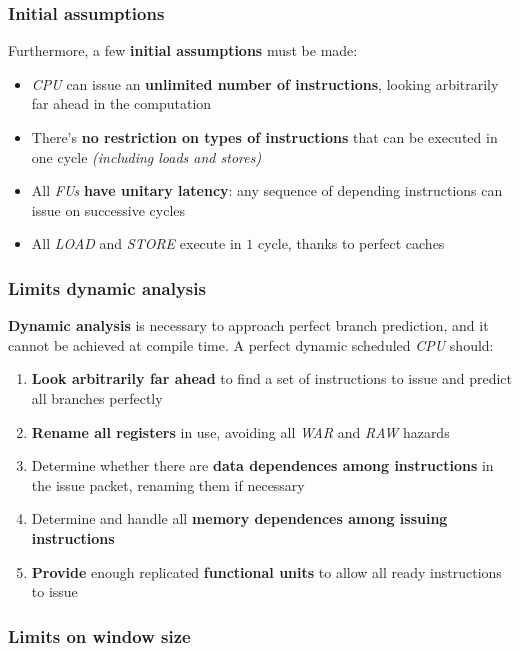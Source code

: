 \documentclass[english]{article}
\begin{document}
\subsubsection{Initial assumptions}

Furthermore, a few \textbf{initial assumptions} must be made:

\begin{itemize}
  \item \textit{CPU} can issue an\textbf{ unlimited number of instructions}, looking arbitrarily far ahead in the computation
  \item There's \textbf{no restriction on types of instructions} that can be executed in one cycle \textit{(including loads and stores)}
  \item All \textit{FUs} \textbf{have unitary latency}: any sequence of depending instructions can issue on successive cycles
  \item All \textit{LOAD} and \textit{STORE} execute in \(1\) cycle, thanks to perfect caches
\end{itemize}

\subsubsection{Limits dynamic analysis}

\textbf{Dynamic analysis} is necessary to approach perfect branch prediction, and it cannot be achieved at compile time.
A perfect dynamic scheduled \textit{CPU} should:

\begin{enumerate}
  \item \textbf{Look arbitrarily far ahead} to find a set of instructions to issue and predict all branches perfectly
  \item \textbf{Rename all registers} in use, avoiding all \textit{WAR} and \textit{RAW} hazards
  \item Determine whether there are \textbf{data dependences among instructions} in the issue packet, renaming them if necessary
  \item Determine and handle all \textbf{memory dependences among issuing instructions}
  \item \textbf{Provide} enough replicated \textbf{functional units} to allow all ready instructions to issue
\end{enumerate}

\subsubsection{Limits on window size}
\end{document}
